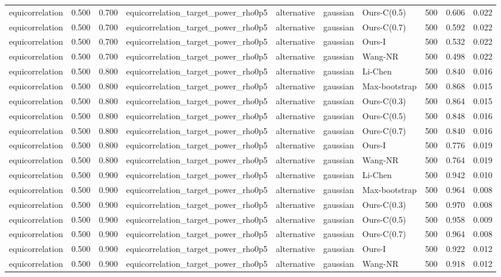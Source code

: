 \begin{tabular}{lrrllllrrr}
equicorrelation & 0.500 & 0.700 & equicorrelation\_target\_power\_rho0p5 & alternative & gaussian & Ours-C(0.5) & 500 & 0.606 & 0.022 \\
equicorrelation & 0.500 & 0.700 & equicorrelation\_target\_power\_rho0p5 & alternative & gaussian & Ours-C(0.7) & 500 & 0.592 & 0.022 \\
equicorrelation & 0.500 & 0.700 & equicorrelation\_target\_power\_rho0p5 & alternative & gaussian & Ours-I & 500 & 0.532 & 0.022 \\
equicorrelation & 0.500 & 0.700 & equicorrelation\_target\_power\_rho0p5 & alternative & gaussian & Wang-NR & 500 & 0.498 & 0.022 \\
equicorrelation & 0.500 & 0.800 & equicorrelation\_target\_power\_rho0p5 & alternative & gaussian & Li-Chen & 500 & 0.840 & 0.016 \\
equicorrelation & 0.500 & 0.800 & equicorrelation\_target\_power\_rho0p5 & alternative & gaussian & Max-bootstrap & 500 & 0.868 & 0.015 \\
equicorrelation & 0.500 & 0.800 & equicorrelation\_target\_power\_rho0p5 & alternative & gaussian & Ours-C(0.3) & 500 & 0.864 & 0.015 \\
equicorrelation & 0.500 & 0.800 & equicorrelation\_target\_power\_rho0p5 & alternative & gaussian & Ours-C(0.5) & 500 & 0.848 & 0.016 \\
equicorrelation & 0.500 & 0.800 & equicorrelation\_target\_power\_rho0p5 & alternative & gaussian & Ours-C(0.7) & 500 & 0.840 & 0.016 \\
equicorrelation & 0.500 & 0.800 & equicorrelation\_target\_power\_rho0p5 & alternative & gaussian & Ours-I & 500 & 0.776 & 0.019 \\
equicorrelation & 0.500 & 0.800 & equicorrelation\_target\_power\_rho0p5 & alternative & gaussian & Wang-NR & 500 & 0.764 & 0.019 \\
equicorrelation & 0.500 & 0.900 & equicorrelation\_target\_power\_rho0p5 & alternative & gaussian & Li-Chen & 500 & 0.942 & 0.010 \\
equicorrelation & 0.500 & 0.900 & equicorrelation\_target\_power\_rho0p5 & alternative & gaussian & Max-bootstrap & 500 & 0.964 & 0.008 \\
equicorrelation & 0.500 & 0.900 & equicorrelation\_target\_power\_rho0p5 & alternative & gaussian & Ours-C(0.3) & 500 & 0.970 & 0.008 \\
equicorrelation & 0.500 & 0.900 & equicorrelation\_target\_power\_rho0p5 & alternative & gaussian & Ours-C(0.5) & 500 & 0.958 & 0.009 \\
equicorrelation & 0.500 & 0.900 & equicorrelation\_target\_power\_rho0p5 & alternative & gaussian & Ours-C(0.7) & 500 & 0.964 & 0.008 \\
equicorrelation & 0.500 & 0.900 & equicorrelation\_target\_power\_rho0p5 & alternative & gaussian & Ours-I & 500 & 0.922 & 0.012 \\
equicorrelation & 0.500 & 0.900 & equicorrelation\_target\_power\_rho0p5 & alternative & gaussian & Wang-NR & 500 & 0.918 & 0.012 \\
\bottomrule
\end{tabular}
